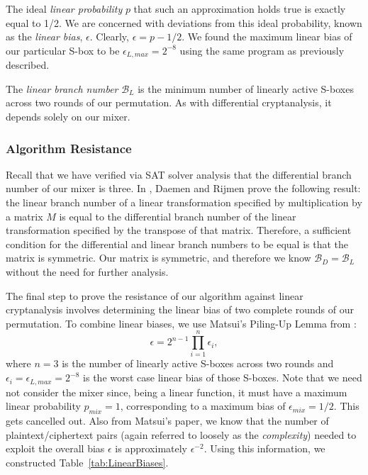 The ideal \emph{linear probability} $p$ that such an approximation holds true is exactly equal to 1/2.
We are concerned with deviations from this ideal probability, known as the \emph{linear bias}, $\epsilon$. 
Clearly, $\epsilon = p - 1/2$.
We found the maximum linear bias of our particular S-box to be $\epsilon_{L,max} = 2^{-8}$ using the same program as previously described.

The \emph{linear branch number} $\mathcal{B}_L$ is the minimum number of linearly active S-boxes across two rounds of our permutation.
As with differential cryptanalysis, it depends solely on our mixer.

\subsubsection{Algorithm Resistance}
Recall that we have verified via SAT solver analysis that the differential branch number of our mixer is three.
In \cite{Daemen2002_DesignOfRijndael}, Daemen and Rijmen prove the following result: the linear branch number of a linear transformation specified by multiplication by a matrix $M$ is equal to the differential branch number of the linear transformation specified by the transpose of that matrix.
Therefore, a sufficient condition for the differential and linear branch numbers to be equal is that the matrix is symmetric.
Our matrix is symmetric, and therefore we know $\mathcal{B}_D = \mathcal{B}_L$ without the need for further analysis.

The final step to prove the resistance of our algorithm against linear cryptanalysis involves determining the linear bias of two complete rounds of our permutation.
To combine linear biases, we use Matsui's Piling-Up Lemma from \cite{Matsui1993_Linear}:
\begin{equation*}
\epsilon = 2^{n-1} \prod\limits_{i = 1}^n \epsilon_i,
\end{equation*}
where $n = 3$ is the number of linearly active S-boxes across two rounds and $\epsilon_i = \epsilon_{L,max} = 2^{-8}$ is the worst case linear bias of those S-boxes.
Note that we need not consider the mixer since, being a linear function, it must have a maximum linear probability $p_{mix} = 1$, corresponding to a maximum bias of $\epsilon_{mix} = 1/2$. This gets cancelled out.
Also from Matsui's paper, we know that the number of plaintext/ciphertext pairs (again referred to loosely as the \emph{complexity}) needed to exploit the overall bias $\epsilon$ is approximately $\epsilon^{-2}$.
Using this information, we constructed Table~\ref{tab:LinearBiases}.

